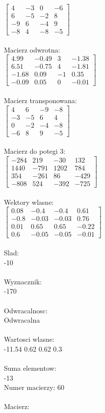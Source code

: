 \documentclass[a4paper,12pt]{article}
\begin{document}
$\begin{bmatrix} 4&-3&0&-6\\6&-5&-2&8\\-9&6&-4&9\\-8&4&-8&-5 \end{bmatrix}$
\\
\\
Macierz odwrotna:\\

$\begin{bmatrix} 4.99&-0.49&3&-1.38\\6.51&-0.75&4&-1.81\\-1.68&0.09&-1&0.35\\-0.09&0.05&0&-0.01 \end{bmatrix}$
\\
\\
Macierz transponowana:\\

$\begin{bmatrix} 4&6&-9&-8\\-3&-5&6&4\\0&-2&-4&-8\\-6&8&9&-5 \end{bmatrix}$
\\
\\
Macierz do potegi 3:\\

$\begin{bmatrix} -284&219&-30&132\\1440&-791&1202&784\\354&-261&86&-429\\-808&524&-392&-725 \end{bmatrix}$
\\
\\
Wektory wlasne:\\

$\begin{bmatrix} 0.08&-0.4&-0.4&0.61\\-0.8&-0.03&-0.03&0.76\\0.01&0.65&0.65&-0.22\\0.6&-0.05&-0.05&-0.01 \end{bmatrix}$
\\
\\
Slad:\\
-10
\\
\\
Wyznacznik:\\
-170
\\
\\
Odwracalnosc:\\
Odwracalna
\\
\\
Wartosci wlasne:\\
-11.54 0.62 0.62 0.3
\\
\\
Suma elementow:\\
-13
\\
\newpage
Numer macierzy:
60
\\
\\
Macierz:\\
\end{document}
